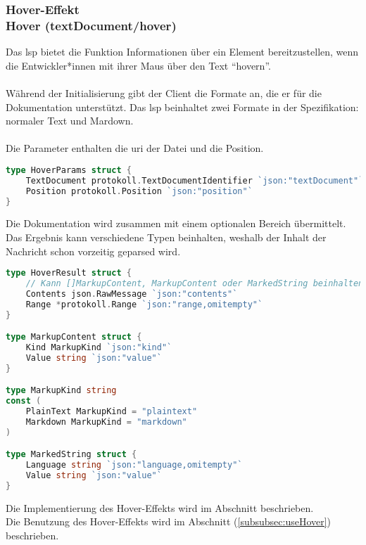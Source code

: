 \documentclass[./einleitung.tex]{subfiles}
\begin{document}
    \subsubsection[Hover-Effekt]{Hover-Effekt\\ {\textnormal{\footnotesize Hover (textDocument/hover) \cite{hover}}}}\label{subsubsec:hover}
    Das \acrshort{lsp} bietet die Funktion Informationen über ein Element bereitzustellen, wenn die Entwickler*innen mit ihrer Maus über den Text ``hovern''.
    \\\\
    Während der Initialisierung gibt der Client die Formate an, die er für die Dokumentation unterstützt.
    Das \acrshort{lsp} beinhaltet zwei Formate in der Spezifikation: normaler Text und Mardown.
    \\\\
    Die Parameter enthalten die \acrshort{uri} der Datei und die Position.
    \begin{lstlisting}[language=Go, caption=Definition der Hover Paramer, label=lst:hoverParams]
type HoverParams struct {
	TextDocument protokoll.TextDocumentIdentifier `json:"textDocument"`
	Position protokoll.Position `json:"position"`
}
    \end{lstlisting}
    Die Dokumentation wird zusammen mit einem optionalen Bereich übermittelt.
    Das Ergebnis kann verschiedene Typen beinhalten, weshalb der Inhalt der Nachricht schon vorzeitig geparsed wird.
    \begin{lstlisting}[language=Go, caption=Definition des Hover Ergebnis, label=lst:hover]
type HoverResult struct {
    // Kann []MarkupContent, MarkupContent oder MarkedString beinhalten.
	Contents json.RawMessage `json:"contents"`
	Range *protokoll.Range `json:"range,omitempty"`
}

type MarkupContent struct {
	Kind MarkupKind `json:"kind"`
	Value string `json:"value"`
}

type MarkupKind string
const (
	PlainText MarkupKind = "plaintext"
	Markdown MarkupKind = "markdown"
)

type MarkedString struct {
	Language string `json:"language,omitempty"`
	Value string `json:"value"`
}
    \end{lstlisting}
    Die Implementierung des Hover-Effekts wird im Abschnitt  beschrieben.\\
    Die Benutzung des Hover-Effekts wird im Abschnitt  (\ref{subsubsec:useHover}) beschrieben.
\end{document}
